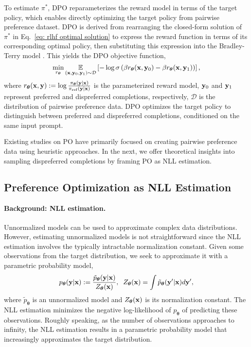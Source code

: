 To estimate $\pi^{\ast}$,
DPO reparameterizes the reward model in terms of the target policy, which enables directly optimizing the target policy
from pairwise preference dataset.
DPO is derived from rearranging the closed-form solution of $\pi^{\ast}$ in Eq.~\eqref{eq: rlhf optimal solution} to express the reward function in terms of its corresponding optimal policy,
then substituting this expression into the Bradley-Terry model \citep{bradley1952rank}.
This yields the DPO objective function,
\begin{equation}
\label{eq:dpo}
\min_{r_{\boldsymbol{\theta}}} 
\underset{(\mathbf{x}, \mathbf{y}_0, \mathbf{y}_1) \sim \mathcal{D}}{\mathbb{E}}
\left[ 
    -\log \sigma\left( 
        \beta r_{\boldsymbol\theta}(\mathbf{x}, \mathbf{y}_0) 
        - \beta r_{\boldsymbol\theta}(\mathbf{x}, \mathbf{y}_1)
    \right)
\right],
\end{equation}
where $r_{\boldsymbol\theta}(\mathbf{x}, \mathbf{y}) := \log \frac{\pi_{\boldsymbol\theta}(\mathbf{y} | \mathbf{x})} {\pi_{\rm ref}(\mathbf{y} | \mathbf{x})}$ is the parameterized reward model,
$\mathbf{y}_0$ and $\mathbf{y}_1$ represent preferred and dispreferred completions, respectively,
$\mathcal{D}$ is the distribution of pairwise preference data.
DPO optimizes the target policy to distinguish between preferred and dispreferred completions, conditioned on the same input prompt.

Existing studies on PO have primarily focused on creating pairwise preference data using heuristic approaches.
In the next, we offer theoretical insights into sampling dispreferred completions by framing PO as NLL estimation. 


\subsection{Preference Optimization as NLL Estimation}
\label{sec: preference optimization as nll estimation}
\paragraph{Background: NLL estimation.}
Unnormalized models can be used to approximate complex data distributions.
However,
estimating unnormalized models is not straightforward since the NLL estimation involves the typically intractable normalization constant.
Given some observations from the target distribution,
we seek to approximate it with a parametric probability model,
\begin{equation}
\label{eq: expression for probability distribution}
p_{\boldsymbol\theta}(\mathbf{y} | \mathbf{x})
:=
\frac{\tilde{p}_{\boldsymbol\theta}(\mathbf{y} | \mathbf{x})}
{Z_{\boldsymbol\theta}(\mathbf{x})},
\;\;
Z_{\boldsymbol\theta}(\mathbf{x})
=
\int
\tilde{p}_{\boldsymbol\theta}(\mathbf{y}' | \mathbf{x})
d \mathbf{y}',
\end{equation}
where $\tilde{p}_{\boldsymbol\theta}$ is an unnormalized model and $Z_{\boldsymbol\theta}(\mathbf{x})$ is its normalization constant.
The NLL estimation minimizes the negative log-likelihood of $p_{\boldsymbol\theta}$ of predicting these observations.
Roughly speaking,
as the number of observations approaches to infinity,
the NLL estimation results in a parametric probability model 
that increasingly approximates the target distribution.


